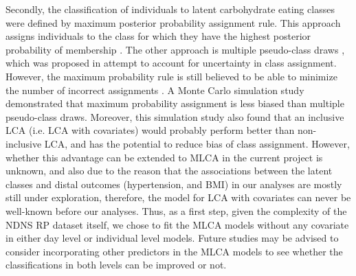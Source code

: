 Secondly, the classification of individuals to latent carbohydrate eating classes were defined by maximum posterior probability assignment rule. This approach assigns individuals to the class for which they have the highest posterior probability of membership \parencite{nagin2005group}. The other approach is multiple pseudo-class draws \parencite{wang2005residual}, which was proposed in attempt to account for uncertainty in class assignment. However, the maximum probability rule is still believed to be able to minimize the number of incorrect assignments \parencite{goodman20071}. A Monte Carlo simulation study \parencite{bray2015eliminating} demonstrated that maximum probability assignment is less biased than multiple pseudo-class draws. Moreover, this simulation study also found that an inclusive LCA (i.e. LCA with covariates) would probably perform better than non-inclusive LCA, and has the potential to reduce bias of class assignment. However, whether this advantage can be extended to MLCA in the current project is unknown, and also due to the reason that the associations between the latent classes and distal outcomes (hypertension, and BMI) in our analyses are mostly still under exploration, therefore, the model for LCA with covariates can never be well-known before our analyses. Thus, as a first step, given the complexity of the NDNS RP dataset itself, we chose to fit the MLCA models without any covariate in either day level or individual level models. Future studies may be advised to consider incorporating other predictors in the MLCA models to see whether the classifications in both levels can be improved or not. 

